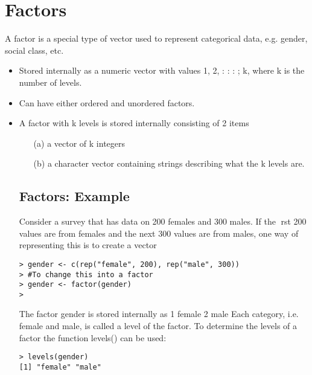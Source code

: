 \section{Factors}
A factor is a special type of vector used to represent categorical
data, e.g. gender, social class, etc.
\begin{itemize}
\item Stored internally as a numeric vector with values 1, 2, : : : ; k,
where k is the number of levels.
\item Can have either ordered and unordered factors.
\item A factor with k levels is stored internally consisting of 2 items
\begin{itemize}
\item[(a)] a vector of k integers
\item[(b)] a character vector containing strings describing what the k
levels are.
\end{itemize}


\begin{frame}

\subsection{Factors: Example}
Consider a survey that has data on 200 females and 300 males. If
the rst 200 values are from females and the next 300 values are
from males, one way of representing this is to create a vector
\begin{framed}
\begin{verbatim}
> gender <- c(rep("female", 200), rep("male", 300))
> #To change this into a factor
> gender <- factor(gender)
>
\end{verbatim}
\end{framed}
The factor gender is stored internally as
1 female
2 male
Each category, i.e. female and male, is called a level of the factor.
To determine the levels of a factor the function levels() can be
used:
\begin{framed}
\begin{verbatim}
> levels(gender)
[1] "female" "male"
\end{verbatim}
\end{framed}

\end{frame}
\end{itemize}
